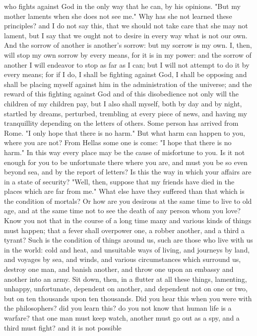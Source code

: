 \documentclass[a4paper]{article}
\begin{document}
who fights against God in the only way that he can, by his opinions.
    "But my mother laments when she does not see me." Why has she not learned
these principles? and I do not say this, that we should not take care that she
may not lament, but I say that we ought not to desire in every way what is not
our own. And the sorrow of another is another's sorrow: but my sorrow is my
own. I, then, will stop my own sorrow by every means, for it is in my power:
and the sorrow of another I will endeavor to stop as far as I can; but I will
not attempt to do it by every means; for if I do, I shall be fighting against
God, I shall be opposing and shall be placing myself against him in the
administration of the universe; and the reward of this fighting against God and
of this disobedience not only will the children of my children pay, but I also
shall myself, both by day and by night, startled by dreams, perturbed,
trembling at every piece of news, and having my tranquillity depending on the
letters of others. Some person has arrived from Rome. "I only hope that there
is no harm." But what harm can happen to you, where you are not? From Hellas
some one is come: "I hope that there is no harm." In this way every place may
be the cause of misfortune to you. Is it not enough for you to be unfortunate
there where you are, and must you be so even beyond sea, and by the report of
letters? Is this the way in which your affairs are in a state of security?
"Well, then, suppose that my friends have died in the places which are far from
me." What else have they suffered than that which is the condition of mortals?
Or how are you desirous at the same time to live to old age, and at the same
time not to see the death of any person whom you love? Know you not that in the
course of a long time many and various kinds of things must happen; that a
fever shall overpower one, a robber another, and a third a tyrant? Such is the
condition of things around us, such are those who live with us in the world:
cold and heat, and unsuitable ways of living, and journeys by land, and voyages
by sea, and winds, and various circumstances which surround us, destroy one
man, and banish another, and throw one upon an embassy and another into an
army. Sit down, then, in a flutter at all these things, lamenting, unhappy,
unfortunate, dependent on another, and dependent not on one or two, but on ten
thousands upon ten thousands.
    Did you hear this when you were with the philosophers? did you learn this?
do you not know that human life is a warfare? that one man must keep watch,
another must go out as a spy, and a third must fight? and it is not possible
\end{document}

